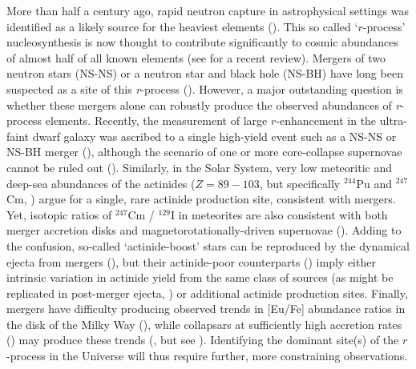 \documentclass[twocolumn, twocolappendix]{aastex63}
\begin{document}
More than half a century ago, rapid neutron capture in astrophysical settings was identified as a likely source for the heaviest elements (\citealt{burbidge57, cameron57}). This so called `$r$-process' nucleosynthesis is now thought to contribute significantly to cosmic abundances of almost half of all known elements (see \citealt{cowan21} for a recent review). Mergers of two neutron stars (NS-NS) or a neutron star and black hole (NS-BH) have long been suspected as a site of this \textit{r}-process (\citealt{lattimer74, symbalisty82, eichler89, freiburghaus99, goriely11, korobkin12, bauswein13}). However, a major outstanding question is whether these mergers alone can robustly produce the observed abundances of \textit{r}-process elements. Recently, the measurement of large $r$-enhancement in the ultra-faint dwarf galaxy  was ascribed to a single high-yield event such as a NS-NS or NS-BH merger (\citealt{ji16, roederer16}), although the scenario of one or more core-collapse supernovae cannot be ruled out (\citealt{beniamini16}). Similarly, in the Solar System, very low meteoritic and deep-sea abundances of the actinides ($Z = 89-103$, but specifically ${}^{244}$Pu and ${}^{247}$Cm, \citealt{wallner15, bartos19}) argue for a single, rare actinide production site, consistent with mergers. Yet, isotopic ratios of ${}^{247}$Cm / ${}^{129}$I in meteorites are also consistent with both merger accretion disks and magnetorotationally-driven supernovae (\citealt{cote21}). Adding to the confusion, so-called `actinide-boost' stars can be reproduced by the dynamical ejecta from mergers (\citealt{lai08, roederer09, holmbeck18}), but their actinide-poor counterparts (\citealt{holmbeck19a}) imply either intrinsic variation in actinide yield from the same class of sources (as might be replicated in post-merger ejecta, \citealt{holmbeck19b}) or additional actinide production sites. Finally, mergers have difficulty producing observed trends in [Eu/Fe] abundance ratios in the disk of the Milky Way (\citealt{cote19}), while collapsars at sufficiently high accretion rates (\citealt{siegel19}) may produce these trends (\citealt{brauer20, yamazaki21}, but see \citealt{wanajo21}). Identifying the dominant site(s) of the $r$-process in the Universe will thus require further, more constraining observations. 
\end{document}
